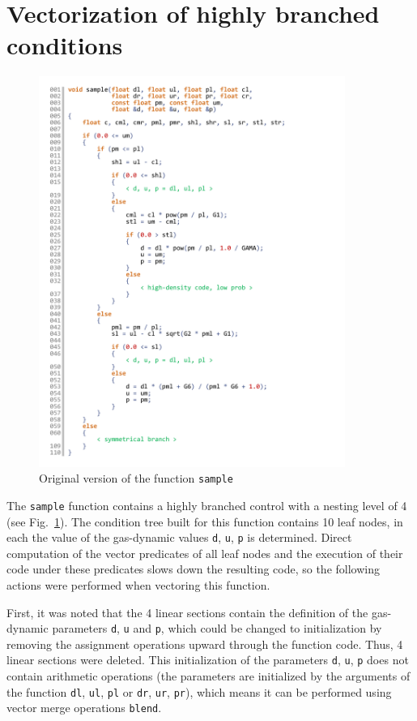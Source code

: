 \documentclass[utf8,english]{psta}%
\begin{document}
\section{Vectorization of highly branched conditions}

\begin{figure}
\includegraphics[width=10cm]{pics/pic_sample_code_4}
\caption{Original version of the function \texttt{sample}}
\label{pic:sample_code_4}
\end{figure}

The \texttt{sample} function contains a highly branched control with a nesting level of 4 (see Fig.~\ref{pic:sample_code_4}).
The condition tree built for this function contains 10 leaf nodes, in each the value of the gas-dynamic values \texttt{d}, \texttt{u}, \texttt{p} is determined.
Direct computation of the vector predicates of all leaf nodes and the execution of their code under these predicates slows down the resulting code, so the following actions were performed when vectoring this function.

First, it was noted that the 4 linear sections contain the definition of the gas-dynamic parameters \texttt{d}, \texttt{u} and \texttt{p}, which could be changed to initialization by removing the assignment operations upward through the function code.
Thus, 4 linear sections were deleted.
This initialization of the parameters \texttt{d}, \texttt{u}, \texttt{p} does not contain arithmetic operations (the parameters are initialized by the arguments of the function \texttt{dl}, \texttt{ul}, \texttt{pl} or \texttt{dr}, \texttt{ur}, \texttt{pr}), which means it can be performed using vector merge operations \texttt{blend}.
\end{document}

